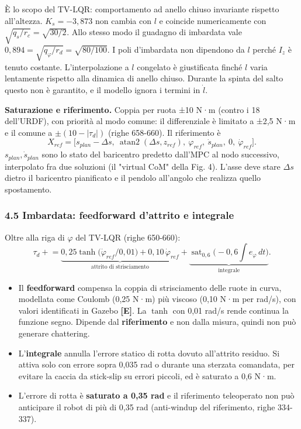 \documentclass[
]{article}
\providecommand{\tightlist}{%
  \setlength{\itemsep}{0pt}\setlength{\parskip}{0pt}}
\begin{document}
È lo scopo del TV-LQR: comportamento ad anello chiuso invariante rispetto all'altezza. \(K_s = -3{,}873\) non cambia con \(l\) e coincide numericamente con \(\sqrt{q_s/r_c} = \sqrt{30/2}\). Allo stesso modo il guadagno di imbardata vale \(0{,}894 = \sqrt{q_\varphi/r_d} = \sqrt{80/100}\). I poli d'imbardata non dipendono da \(l\) perché \(I_z\) è tenuto costante. L'interpolazione a \(l\) congelato è giustificata finché \(l\) varia lentamente rispetto alla dinamica di anello chiuso. Durante la spinta del salto questo non è garantito, e il modello ignora i termini in \(\dot l\).

\textbf{Saturazione e riferimento.} Coppia per ruota ±10 N·m (contro i 18 dell'URDF), con priorità al modo comune: il differenziale è limitato a ±2,5 N·m e il comune a \(\pm(10-|\tau_d|)\) (righe 658-660). Il riferimento è \[X_{ref} = \big[s_{plan}-\Delta s,\ \operatorname{atan2}(\Delta s, z_{ref}),\ \varphi_{ref},\ \dot s_{plan},\ 0,\ \dot\varphi_{ref}\big].\] \(s_{plan}, \dot s_{plan}\) sono lo stato del baricentro predetto dall'MPC al nodo successivo, interpolato fra due soluzioni (il "virtual CoM" della Fig. 4). L'asse deve stare \(\Delta s\) dietro il baricentro pianificato e il pendolo all'angolo che realizza quello spostamento.

\subsubsection{4.5 Imbardata: feedforward d'attrito e integrale}\label{45-imbardata-feedforward-dattrito-e-integrale}

Oltre alla riga di \(\varphi\) del TV-LQR (righe 650-660): \[\tau_d \mathrel{+}= \underbrace{0{,}25\tanh\!\big(\dot\varphi_{ref}/0{,}01\big) + 0{,}10\,\dot\varphi_{ref}}_{\text{attrito di strisciamento}} + \underbrace{\operatorname{sat}_{0,6}\Big(-0{,}6\!\int\! e_\varphi\,dt\Big)}_{\text{integrale}} .\]

\begin{itemize}
\tightlist
\item Il \textbf{feedforward} compensa la coppia di strisciamento delle ruote in curva, modellata come Coulomb (0,25 N·m) più viscoso (0,10 N·m per rad/s), con valori identificati in Gazebo \textbf{[E]}. La \(\tanh\) con 0,01 rad/s rende continua la funzione segno. Dipende dal \textbf{riferimento} e non dalla misura, quindi non può generare chattering.
\item L'\textbf{integrale} annulla l'errore statico di rotta dovuto all'attrito residuo. Si attiva solo con errore sopra 0,035 rad o durante una sterzata comandata, per evitare la caccia da stick-slip su errori piccoli, ed è saturato a 0,6 N·m.
\item L'errore di rotta è \textbf{saturato a 0,35 rad} e il riferimento teleoperato non può anticipare il robot di più di 0,35 rad (anti-windup del riferimento, righe 334-337).
\end{itemize}
\end{document}
